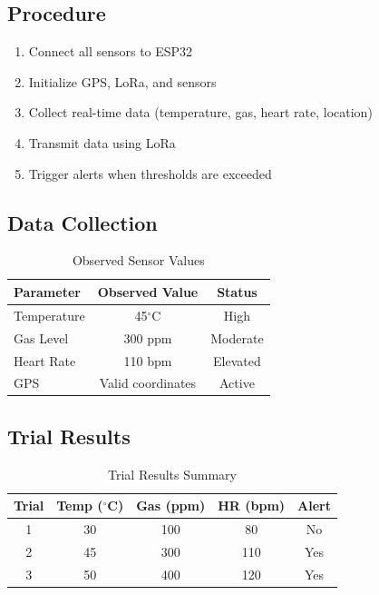 \documentclass[conference]{IEEEtran}
\begin{document}
	\subsection{Procedure}
	
	\begin{enumerate}
		\item Connect all sensors to ESP32
		\item Initialize GPS, LoRa, and sensors
		\item Collect real-time data (temperature, gas, heart rate, location)
		\item Transmit data using LoRa
		\item Trigger alerts when thresholds are exceeded
	\end{enumerate}
	
	\subsection{Data Collection}
	
	\begin{table}[h]
		\caption{Observed Sensor Values}
		\label{tab:datacollection}
		\centering
		\begin{tabular}{|l|c|c|}
			\hline
			\textbf{Parameter} & \textbf{Observed Value} & \textbf{Status} \\
			\hline
			Temperature   & 45$^\circ$C           & High \\
			\hline
			Gas Level     & 300 ppm               & Moderate \\
			\hline
			Heart Rate    & 110 bpm               & Elevated \\
			\hline
			GPS           & Valid coordinates     & Active \\
			\hline
		\end{tabular}
	\end{table}
	
	\subsection{Trial Results}
	
	\begin{table}[h]
		\caption{Trial Results Summary}
		\label{tab:trials}
		\centering
		\begin{tabular}{|c|c|c|c|c|}
			\hline
			\textbf{Trial} & \textbf{Temp ($^\circ$C)} & \textbf{Gas (ppm)} &
			\textbf{HR (bpm)} & \textbf{Alert} \\
			\hline
			1 & 30 & 100 & 80  & No \\
			\hline
			2 & 45 & 300 & 110 & Yes \\
			\hline
			3 & 50 & 400 & 120 & Yes \\
			\hline
		\end{tabular}
	\end{table}
	
\end{document}
